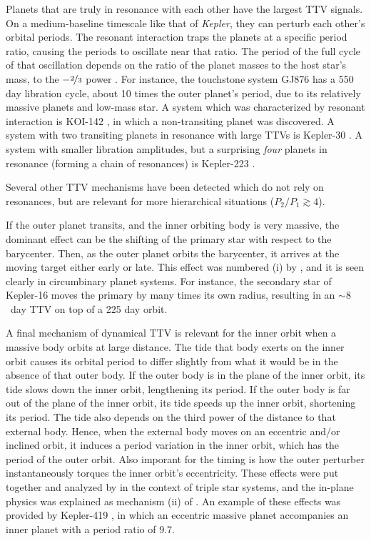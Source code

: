 \documentclass[graybox,natbib,nosecnum]{svmult}
\begin{document}
Planets that are truly in resonance with each other have the largest TTV signals.  On a medium-baseline timescale like that of \emph{Kepler}, they can perturb each other's orbital periods.  The resonant interaction traps the planets at a specific period ratio, causing the periods to oscillate near that ratio.  The period of the full cycle of that oscillation depends on the ratio of the planet masses to the host star's mass, to the $-\nicefrac{2}{3}$ power \citep{2005MNRAS.359..567A,2016ApJ...823...72N}.  For instance, the touchstone system GJ876 has a 550 day libration cycle, about 10 times the outer planet's period, due to its relatively massive planets and low-mass star.  A system which was characterized by resonant interaction is KOI-142 \citep{2013ApJ...777....3N}, in which a non-transiting planet was discovered.   A system with two transiting planets in resonance with large TTVs is Kepler-30 \citep{2012ApJ...750..114F}.  A system with smaller libration amplitudes, but a surprising \emph{four} planets in resonance (forming a chain of resonances) is Kepler-223 \citep{2016Natur.533..509M}.

Several other TTV mechanisms have been detected which do not rely on resonances, but are relevant for more hierarchical situations ($P_2/P_1 \gtrsim 4$). 

If the outer planet transits, and the inner orbiting body is very massive, the dominant effect can be the shifting of the primary star with respect to the barycenter.   Then, as the outer planet orbits the barycenter, it arrives at the moving target either early or late.  This effect was numbered (i) by \cite{2005MNRAS.359..567A}, and it is seen clearly in circumbinary planet systems.  For instance, the secondary star of Kepler-16 \citep{2011Sci...333.1602D} moves the primary by many times its own radius, resulting in an $\sim 8$~day TTV on top of a 225 day orbit. 

A final mechanism of dynamical TTV is relevant for the inner orbit when a massive body orbits at large distance.  The tide that body exerts on the inner orbit causes its orbital period to differ slightly from what it would be in the absence of that outer body.  If the outer body is in the plane of the inner orbit, its tide slows down the inner orbit, lengthening its period.  If the outer body is far out of the plane of the inner orbit, its tide speeds up the inner orbit, shortening its period.  The tide also depends on the third power of the distance to that external body.  Hence, when the external body moves on an eccentric and/or inclined orbit, it induces a period variation in the inner orbit, which has the period of the outer orbit.  Also imporant for the timing is how the outer perturber instantaneously torques the inner orbit's eccentricity.  These effects were put together and analyzed by \cite{2003A&A...398.1091B} in the context of triple star systems, and the in-plane physics was explained as mechanism (ii) of \cite{2005MNRAS.359..567A}.  An example of these effects was provided by Kepler-419 \citep{2014ApJ...791...89D}, in which an eccentric massive planet accompanies an inner planet with a period ratio of 9.7.
\end{document}
